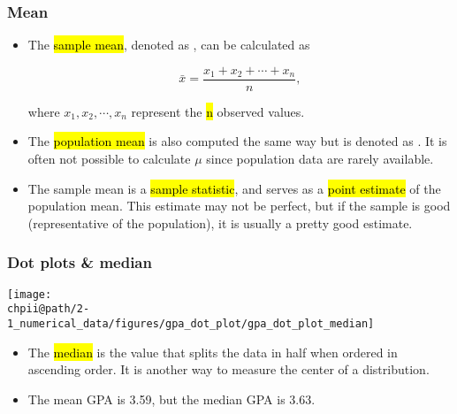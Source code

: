 \documentclass[slidestop,compress,mathserif]{beamer}
\makeatletter
\def\chpii@path{../../Chp 2}
\makeatother
\begin{document}
\begin{frame}
\frametitle{Mean}

\begin{itemize}

\item The \hl{sample mean}, denoted as , can be calculated as

\[ \bar{x} = \frac{x_1 + x_2 + \cdots + x_n}{n}, \]

where $x_1, x_2, \cdots, x_n$ represent the \hl{n} observed values.

\item The \hl{population mean} is also computed the same way but is denoted as \mathhl{\mu}. It is often not possible to calculate $\mu$ since population data are rarely available.

\item The sample mean is a \hl{sample statistic}, and serves as a \hl{point estimate} of the population mean. This estimate may not be perfect, but if the sample is good (representative of the population), it is usually a pretty good estimate. 

\end{itemize}

\end{frame}



\begin{frame}
\frametitle{Dot plots \& median}

\begin{center}
\texttt{[image: \\chpii@path/2-1\_numerical\_data/figures/gpa\_dot\_plot/gpa\_dot\_plot\_median]}
\end{center}

\begin{itemize}

\item The \hl{median} is the value that splits the data in half when ordered in ascending order. It is another way to measure the center of a distribution.

\item The mean GPA is 3.59, but the median GPA is 3.63.

\end{itemize} 

\end{frame}


\end{document}
